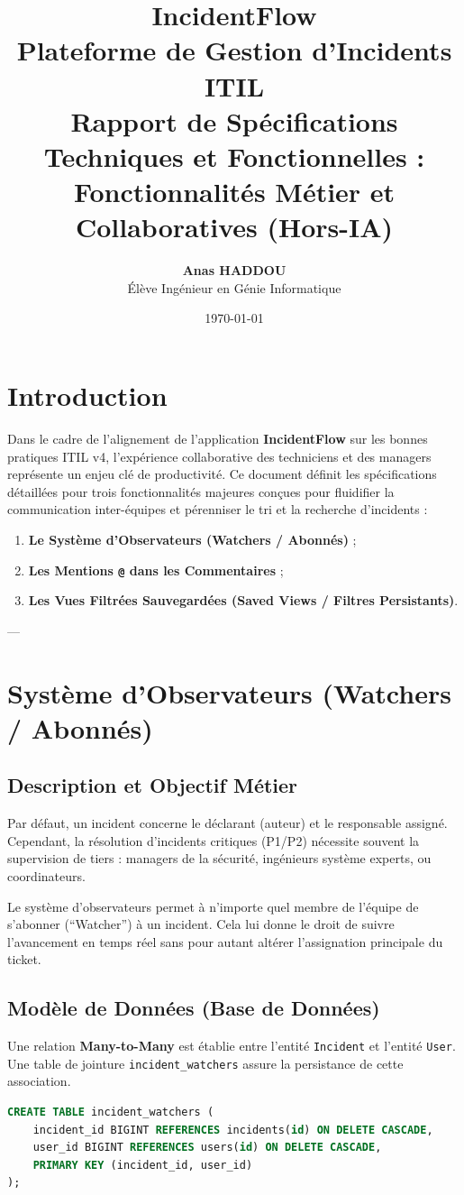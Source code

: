 \documentclass[12pt,a4paper]{article}
\title{
    \textbf{\Huge IncidentFlow}\\[0.5cm]
    \Large Plateforme de Gestion d'Incidents ITIL\\[1.5cm]
    \textbf{\Large Rapport de Spécifications Techniques et Fonctionnelles :\\ Fonctionnalités Métier et Collaboratives (Hors-IA)}
    \vspace{1cm}
}
\author{\textbf{Anas HADDOU} \\ Élève Ingénieur en Génie Informatique}
\date{\today}
\begin{document}
\maketitle
\thispagestyle{empty}
\clearpage

\tableofcontents
\clearpage

\section{Introduction}
Dans le cadre de l'alignement de l'application \textbf{IncidentFlow} sur les bonnes pratiques ITIL v4, l'expérience collaborative des techniciens et des managers représente un enjeu clé de productivité. Ce document définit les spécifications détaillées pour trois fonctionnalités majeures conçues pour fluidifier la communication inter-équipes et pérenniser le tri et la recherche d'incidents :
\begin{enumerate}
    \item \textbf{Le Système d'Observateurs (Watchers / Abonnés)} ;
    \item \textbf{Les Mentions \texttt{@} dans les Commentaires} ;
    \item \textbf{Les Vues Filtrées Sauvegardées (Saved Views / Filtres Persistants)}.
\end{enumerate}

---

\section{Système d'Observateurs (Watchers / Abonnés)}
\subsection{Description et Objectif Métier}
Par défaut, un incident concerne le déclarant (auteur) et le responsable assigné. Cependant, la résolution d'incidents critiques (P1/P2) nécessite souvent la supervision de tiers : managers de la sécurité, ingénieurs système experts, ou coordinateurs. 

Le système d'observateurs permet à n'importe quel membre de l'équipe de s'abonner (``Watcher'') à un incident. Cela lui donne le droit de suivre l'avancement en temps réel sans pour autant altérer l'assignation principale du ticket.

\subsection{Modèle de Données (Base de Données)}
Une relation \textbf{Many-to-Many} est établie entre l'entité \texttt{Incident} et l'entité \texttt{User}. Une table de jointure \texttt{incident\_watchers} assure la persistance de cette association.
\begin{lstlisting}[language=SQL, caption=Schema SQL de la table de jointure, label=sql-watchers]
CREATE TABLE incident_watchers (
    incident_id BIGINT REFERENCES incidents(id) ON DELETE CASCADE,
    user_id BIGINT REFERENCES users(id) ON DELETE CASCADE,
    PRIMARY KEY (incident_id, user_id)
);
\end{lstlisting}
\end{document}
